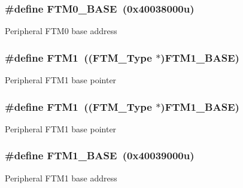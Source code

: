 \subsubsection[{\texorpdfstring{F\+T\+M0\+\_\+\+B\+A\+SE}{FTM0_BASE}}]{\setlength{\rightskip}{0pt plus 5cm}\#define F\+T\+M0\+\_\+\+B\+A\+SE~(0x40038000u)}\hypertarget{group__FTM__Peripheral__Access__Layer_ga2ababc70fbf6b51c721d870fa1c66e45}{}\label{group__FTM__Peripheral__Access__Layer_ga2ababc70fbf6b51c721d870fa1c66e45}
Peripheral F\+T\+M0 base address 
\subsubsection[{\texorpdfstring{F\+T\+M1}{FTM1}}]{\setlength{\rightskip}{0pt plus 5cm}\#define F\+T\+M1~(({\bf F\+T\+M\+\_\+\+Type} $\ast$){\bf F\+T\+M1\+\_\+\+B\+A\+SE})}\hypertarget{group__FTM__Peripheral__Access__Layer_ga48157ff57e27603582bc154901d44301}{}\label{group__FTM__Peripheral__Access__Layer_ga48157ff57e27603582bc154901d44301}
Peripheral F\+T\+M1 base pointer 
\subsubsection[{\texorpdfstring{F\+T\+M1}{FTM1}}]{\setlength{\rightskip}{0pt plus 5cm}\#define F\+T\+M1~(({\bf F\+T\+M\+\_\+\+Type} $\ast$){\bf F\+T\+M1\+\_\+\+B\+A\+SE})}\hypertarget{group__FTM__Peripheral__Access__Layer_ga48157ff57e27603582bc154901d44301}{}\label{group__FTM__Peripheral__Access__Layer_ga48157ff57e27603582bc154901d44301}
Peripheral F\+T\+M1 base pointer 
\subsubsection[{\texorpdfstring{F\+T\+M1\+\_\+\+B\+A\+SE}{FTM1_BASE}}]{\setlength{\rightskip}{0pt plus 5cm}\#define F\+T\+M1\+\_\+\+B\+A\+SE~(0x40039000u)}\hypertarget{group__FTM__Peripheral__Access__Layer_ga15ff8bad7e6945154dcffe5dc7404fd1}{}\label{group__FTM__Peripheral__Access__Layer_ga15ff8bad7e6945154dcffe5dc7404fd1}
Peripheral F\+T\+M1 base address 
